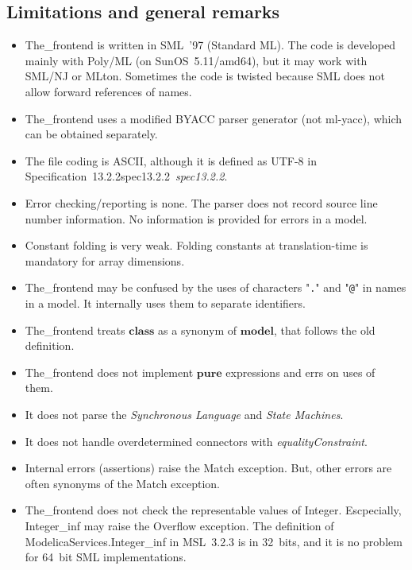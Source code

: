 \documentclass[10pt,b5paper]{article}
\def\specrefx#1#2{Specification~#1\ifx\relax#2\relax{}\else~{\it{}#2}\fi}
\def\specref#1{\specrefx{#1}{\csname spec#1\endcsname}}
\begin{document}
\subsection{Limitations and general remarks}

\begin{itemize}

\item The_frontend is written in SML~'97 (Standard ML).  The code is
developed mainly with Poly/ML (on SunOS~5.11/amd64), but it may work
with SML/NJ or MLton.  Sometimes the code is twisted because SML does
not allow forward references of names.

\item The_frontend uses a modified BYACC parser generator (not
ml-yacc), which can be obtained separately.

\item The file coding is ASCII, although it is defined as UTF-8 in
\specref{13.2.2}.

\item Error checking/reporting is none.  The parser does not record
source line number information.  No information is provided for errors
in a model.

\item Constant folding is very weak.  Folding constants at
translation-time is mandatory for array dimensions.

\item The_frontend may be confused by the uses of characters
"{\tt{}.}" and "{\tt{}@}" in names in a model.  It internally uses
them to separate identifiers.

\item The_frontend treats $\mathbf{class}$ as a synonym of
$\mathbf{model}$, that follows the old definition.

\item The_frontend does not implement $\mathbf{pure}$ expressions and
errs on uses of them.

\item It does not parse the {\it{}Synchronous Language\/} and
{\it{}State Machines}.

\item It does not handle overdetermined connectors with
{\it{}equalityConstraint}.

\item Internal errors (assertions) raise the Match exception.  But,
other errors are often synonyms of the Match exception.

\item The_frontend does not check the representable values of
{Integer}.  Escpecially, {Integer\_inf} may raise the Overflow
exception.  The definition of {ModelicaServices.Integer\_inf} in
MSL~3.2.3 is in 32~bits, and it is no problem for 64~bit SML
implementations.


\end{itemize}
\end{document}

